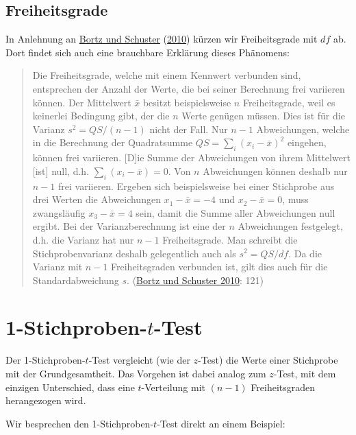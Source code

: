 \documentclass[
  11pt,
  ngerman,
  a4paper,
]{report}
\begin{document}
\hypertarget{freiheitsgrade}{%
\subsection{Freiheitsgrade}\label{freiheitsgrade}}

In Anlehnung an \protect\hyperlink{ref-bortz}{Bortz und Schuster} (\protect\hyperlink{ref-bortz}{2010}) kürzen wir Freiheitsgrade mit \(\mathit{df}\) ab. Dort findet sich auch eine brauchbare Erklärung dieses Phänomens:

\begin{quote}
Die Freiheitsgrade, welche mit einem Kennwert verbunden sind, entsprechen der Anzahl der Werte, die bei seiner Berechnung frei variieren können. Der Mittelwert \(\bar{x}\) besitzt beispielsweise \(n\) Freiheitsgrade, weil es keinerlei Bedingung gibt, der die \(n\) Werte genügen müssen. Dies ist für die Varianz \(s^2=\mathit{QS}/(n-1)\) nicht der Fall. Nur \(n-1\) Abweichungen, welche in die Berechnung der Quadratsumme \(\mathit{QS}=\sum_i(x_i-\bar{x})^2\) eingehen, können frei variieren. {[}D{]}ie Summe der Abweichungen von ihrem Mittelwert {[}ist{]} null, d.h. \(\sum_i(x_i-\bar{x})=0\). Von \(n\) Abweichungen können deshalb nur \(n - 1\) frei variieren. Ergeben sich beispielsweise bei einer Stichprobe aus drei Werten die Abweichungen \(x_1 - \bar{x} = -4\) und \(x_2 - \bar{x} = 0\), muss zwangsläufig \(x_3 -\bar{x} = 4\) sein, damit die Summe aller Abweichungen null ergibt. Bei der Varianzberechnung ist eine der \(n\) Abweichungen festgelegt, d.h. die Varianz hat nur \(n - 1\) Freiheitsgrade. Man schreibt die Stichprobenvarianz deshalb gelegentlich auch als \(s^2 = \mathit{QS}/\mathit{df}\). Da die Varianz mit \(n - 1\) Freiheitsgraden verbunden ist, gilt dies auch für die Standardabweichung \(s\). (\protect\hyperlink{ref-bortz}{Bortz und Schuster 2010}: 121)
\end{quote}

\hypertarget{t-test}{%
\section{\texorpdfstring{1-Stichproben-\(t\)-Test}{1-Stichproben-t-Test}}\label{t-test}}

Der 1-Stichproben-\(t\)-Test vergleicht (wie der \(z\)-Test) die Werte einer Stichprobe mit der Grundgesamtheit. Das Vorgehen ist dabei analog zum \(z\)-Test, mit dem einzigen Unterschied, dass eine \(t\)-Verteilung mit \((n-1)\) Freiheitsgraden herangezogen wird.

Wir besprechen den 1-Stichproben-\(t\)-Test direkt an einem Beispiel:
\end{document}
